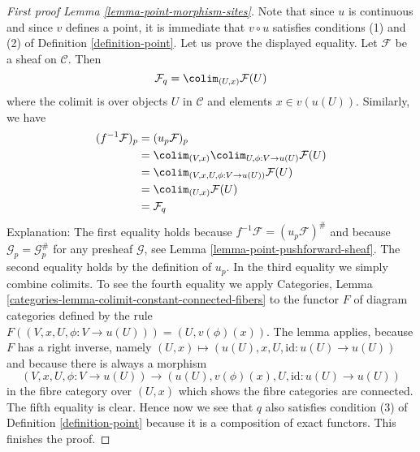 \begin{proof}[First proof Lemma \ref{lemma-point-morphism-sites}]
Note that since $u$ is continuous and
since $v$ defines a point, it is immediate that $v \circ u$ satisfies
conditions (1) and (2) of
Definition \ref{definition-point}.
Let us prove the displayed equality.
Let $\mathcal{F}$ be a sheaf on $\mathcal{C}$.
Then
$$
\mathcal{F}_q = \colim_{(U, x)} \mathcal{F}(U)
$$
where the colimit is over objects $U$ in $\mathcal{C}$ and
elements $x \in v(u(U))$. Similarly, we have
\begin{align*}
(f^{-1}\mathcal{F})_p & = (u_p\mathcal{F})_p \\
& =
\colim_{(V, x)} \colim_{U, \phi : V \to u(U)} \mathcal{F}(U) \\
& = \colim_{(V, x, U, \phi : V \to u(U))} \mathcal{F}(U) \\
& = \colim_{(U, x)} \mathcal{F}(U) \\
& = \mathcal{F}_q
\end{align*}
Explanation:
The first equality holds because $f^{-1}\mathcal{F} = (u_p\mathcal{F})^\#$
and because $\mathcal{G}_p = \mathcal{G}^\#_p$ for any presheaf
$\mathcal{G}$, see
Lemma \ref{lemma-point-pushforward-sheaf}.
The second equality holds by the definition of $u_p$.
In the third equality we simply combine colimits.
To see the fourth equality we apply
Categories, Lemma \ref{categories-lemma-colimit-constant-connected-fibers}
to the functor $F$ of diagram categories defined by the rule
$F((V, x, U, \phi : V \to u(U))) = (U, v(\phi)(x))$.
The lemma applies, because $F$ has a right inverse, namely
$(U, x) \mapsto (u(U), x, U, \text{id} : u(U) \to u(U))$ and
because there is always a morphism
$$
(V, x, U, \phi : V \to u(U))
\longrightarrow
(u(U), v(\phi)(x), U, \text{id} : u(U) \to u(U))
$$
in the fibre category over $(U, x)$ which shows the fibre categories
are connected. The fifth equality is clear.
Hence now we see that $q$ also satisfies condition (3) of
Definition \ref{definition-point}
because it is a composition of exact functors. This finishes the proof.
\end{proof}

